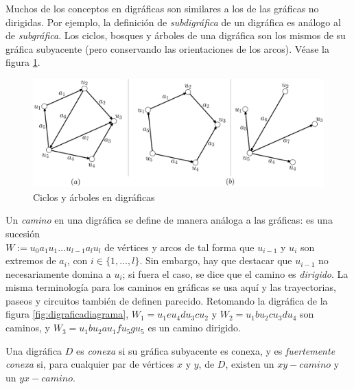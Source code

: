 Muchos de los conceptos     en digráficas son similares a los de las gráficas no dirigidas. Por ejemplo, la definición de  \textit{subdigráfica} de un digráfica es análogo al de \textit{subgráfica}. Los ciclos, bosques y árboles de una digráfica son los mismos de su gráfica subyacente (pero conservando las orientaciones de los arcos). Véase la figura \ref{fig:ciclosdigrafica}. 

 \begin{figure}[H]
    \centering
    \includegraphics[scale=0.17]{img/imgchapter1/ciclosdigrafica.jpg}
    \caption{Ciclos y árboles en digráficas}
    \label{fig:ciclosdigrafica}
\end{figure}

Un \textit{camino}  en una digráfica se define de manera análoga a las gráficas: es una sucesión \\$W:= u_{0}a_{1}u_{1}\ldots u_{l-1}a_{l}u_{l}$ de vértices y arcos de tal forma que $u_{i-1}$ y $u_{i}$ son extremos de $a_{i}$, con $i\in\{1, \ldots, l\}$. Sin embargo, hay que destacar que $u_{i-1}$ no necesariamente domina a $u_{i}$; si fuera el caso, se dice que el camino es  \textit{dirigido}. La misma terminología para los caminos en gráficas se usa aquí y las trayectorias, paseos y circuitos también de definen    parecido. Retomando la digráfica de la figura \ref{fig:digraficadiagrama}, $W_{1} = u_{1}eu_{4}du_{3}cu_{2}$ y $W_{2}=u_{1}bu_{2}cu_{3}du_{4}$ son caminos, y $W_{3}= u_{1}bu_{2}au_{1}fu_{5}gu_{5}$ es un camino dirigido.

Una digráfica $D$ es \textit{conexa} si su gráfica subyacente es conexa, y es \textit{fuertemente conexa}  si, para cualquier par de vértices $x$ y $y$, de $D$, existen un $xy-camino$ y un $yx-camino$.  

